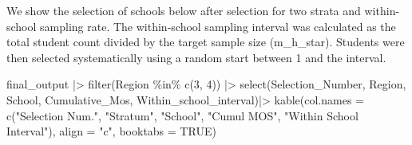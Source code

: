 \documentclass[
  12pt]{article}
\newenvironment{Shaded}{\begin{snugshade}}{\end{snugshade}}
\newcommand{\AttributeTok}[1]{\textcolor[rgb]{0.40,0.45,0.13}{#1}}
\newcommand{\ConstantTok}[1]{\textcolor[rgb]{0.56,0.35,0.01}{#1}}
\newcommand{\DecValTok}[1]{\textcolor[rgb]{0.68,0.00,0.00}{#1}}
\newcommand{\FunctionTok}[1]{\textcolor[rgb]{0.28,0.35,0.67}{#1}}
\newcommand{\NormalTok}[1]{\textcolor[rgb]{0.00,0.23,0.31}{#1}}
\newcommand{\SpecialCharTok}[1]{\textcolor[rgb]{0.37,0.37,0.37}{#1}}
\newcommand{\StringTok}[1]{\textcolor[rgb]{0.13,0.47,0.30}{#1}}
\begin{document}
We show the selection of schools below after selection for two strata
and within-school sampling rate. The within-school sampling interval was
calculated as the total student count divided by the target sample size
(m\_h\_star). Students were then selected systematically using a random
start between 1 and the interval.

\begin{Shaded}
\begin{Highlighting}[]
\NormalTok{final\_output }\SpecialCharTok{|\textgreater{}}
  \FunctionTok{filter}\NormalTok{(Region }\SpecialCharTok{\%in\%} \FunctionTok{c}\NormalTok{(}\DecValTok{3}\NormalTok{, }\DecValTok{4}\NormalTok{)) }\SpecialCharTok{|\textgreater{}} 
  \FunctionTok{select}\NormalTok{(Selection\_Number, Region, School, Cumulative\_Mos, Within\_school\_interval)}\SpecialCharTok{|\textgreater{}} 
   \FunctionTok{kable}\NormalTok{(}\AttributeTok{col.names =} \FunctionTok{c}\NormalTok{(}\StringTok{"Selection Num."}\NormalTok{, }\StringTok{"Stratum"}\NormalTok{, }\StringTok{"School"}\NormalTok{, }\StringTok{"Cumul MOS"}\NormalTok{, }
                        \StringTok{"Within School Interval"}\NormalTok{),}
        \AttributeTok{align =} \StringTok{"c"}\NormalTok{, }\AttributeTok{booktabs =} \ConstantTok{TRUE}\NormalTok{) }
\end{Highlighting}
\end{Shaded}
\end{document}
